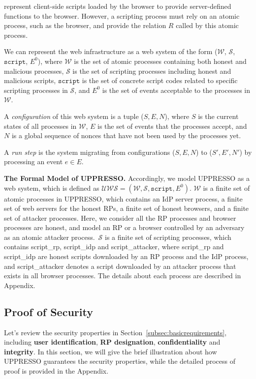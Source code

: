 represent client-side scripts loaded by the browser to provide server-defined functions to the browser. However, a scripting process must rely on an atomic process, such as the browser, and provide the relation $R$ called by this atomic process.


 We can represent the web infrastructure as a web system of the form ($\mathcal{W}$, $\mathcal{S}$, $\mathtt{script}$, $E^0$), where $\mathcal{W}$ is the set of atomic processes containing both honest and malicious processes, $\mathcal{S}$ is the set of scripting processes including honest and malicious scripts, $\mathtt{script}$ is the set of concrete script codes related to specific scripting processes in $\mathcal{S}$, and $E^0$ is the set of events acceptable to the processes in $\mathcal{W}$.

\noindent A {\em configuration} of this web system is a tuple ($S, E, N$), where $S$ is the current states of all processes in $\mathcal{W}$, $E$ is the set of events that the processes accept, and $N$ is a global sequence of nonces that have not been used by the processes yet.

\noindent A {\em run step} is the system migrating from configurations ($S, E, N$) to ($S', E', N'$) by processing an event $e \in E$.

\noindent\textbf{The Formal Model of UPPRESSO.}
Accordingly, we model UPPRESSO as a web system, which is defined as $\mathcal{UWS} = (\mathcal{W}, \mathcal{S}, \mathtt{script}, E^0)$. $\mathcal{W}$ is a finite set of atomic processes in UPPRESSO, which contains an IdP server process, a finite set of web servers for the honest RPs, a finite set of honest browsers, and a finite set of attacker processes. Here, we consider all the RP processes and browser processes are honest, and model an RP or a browser controlled by an adversary as an atomic attacker process.\
$\mathcal{S}$ is a finite set of scripting processes, which contains {\sf script\_rp}, {\sf script\_idp} and {\sf script\_attacker}, where {\sf script\_rp} and {\sf script\_idp} are honest scripts downloaded by an RP process and the IdP process, and {\sf script\_attacker} denotes a script downloaded by an attacker process that exists in all browser processes.
The details about each process are described in Appendix.

\subsection{Proof of Security}
Let's review the security properties in Section~\ref{subsec:basicrequirements}, including \textbf{user identification}, \textbf{RP designation}, \textbf{confidentiality} and \textbf{integrity}. In this section, we will give the brief illustration about how UPPRESSO guarantees the security properties, while the detailed process of proof is provided in the Appendix.

